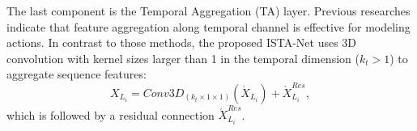 \documentclass[letterpaper, 10 pt, conference]{ieeeconf}
\begin{document}
The last component is the Temporal Aggregation (TA) layer. Previous researches\cite{tcagcn2022,hdgcn2022} indicate that feature aggregation along temporal channel is effective for modeling actions. In contrast to those methods, the proposed ISTA-Net uses 3D convolution with kernel sizes larger than 1 in the temporal dimension ($k_t>1$) to aggregate sequence features:
\begin{equation}
    {X}_{L_i} = Conv3D_{(k_t\times 1 \times 1)}(\acute{X}_{L_i}) + \acute{X}^{Res}_{L_i},
\end{equation}
which is followed by a residual connection $\acute{X}^{Res}_{L_i}$.

\begin{table*}[t]
        \renewcommand\arraystretch{1.3}
	\centering
	\caption{Comparisons of Action Recognition Methods on Four Different Interactive Action Datasets}
	\vspace{-0.7em}
	\label{sota}
\end{table*}
\end{document}
